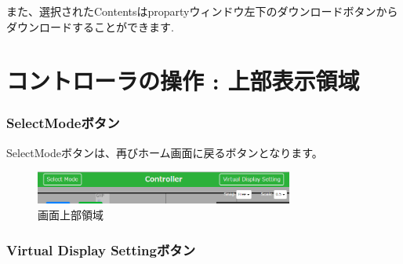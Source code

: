 \documentclass[a4paper,10pt,oneside]{jsbook}
\begin{document}
また、選択されたContentsはpropartyウィンドウ左下のダウンロードボタンから
ダウンロードすることができます.\\


\clearpage 



\chapter{コントローラの操作 : 上部表示領域}
\subsection{SelectModeボタン}
SelectModeボタンは、再びホーム画面に戻るボタンとなります。

\begin{figure}[htbp]
	\begin{center}
		\includegraphics[width=8.5cm]{image/Upper.PNG}
	\end{center}
	\caption{画面上部領域}
	\label{fig:upperarea}
\end{figure}


\subsection{Virtual Display Settingボタン}
\end{document}
